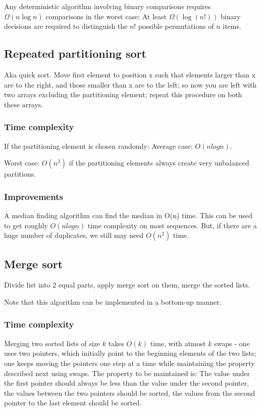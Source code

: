\documentclass[oneside, article]{memoir}
\begin{document}
Any deterministic algorithm involving binary comparisons requires \\$\Omega(n \log n)$ comparisons in the worst case: At least $\Omega(\log (n!))$ binary decisions are required to distinguish the $n!$ possible permutations of $n$ items.

\subsection{Repeated partitioning sort}
Aka quick sort. Move first element to position x such that elements larger than x are to the right, and those smaller than x are to the left; so now you are left with two arrays excluding the partitioning element; repeat this procedure on both these arrays.

\subsubsection{Time complexity}
If the partitioning element is chosen randomly: Average case: $O(n log n)$.

Worst case: $O(n^{2})$ if the partitioning elements always create very unbalanced partitions.

\subsubsection{Improvements}
A median finding algorithm can find the median in O(n) time. This can be used to get roughly $O(n log n)$ time complexity on most sequences. But, if there are a huge number of duplicates, we still may need $O(n^2)$ time.

\subsection{Merge sort}
Divide list into 2 equal parts, apply merge sort on them, merge the sorted lists.

Note that this algorithm can be implemented in a bottom-up manner.

\subsubsection{Time complexity}
Merging two sorted lists of size $k$ takes $O(k)$ time, with atmost $k$ swaps - one uses two pointers, which initially point to the beginning elements of the two lists; one keeps moving the pointers one step at a time while maintaining the property described next using swaps. The property to be maintained is: The value under the first pointer should always be less than the value under the second pointer, the values between the two pointers should be sorted, the values from the second pointer to the last element should be sorted.
\end{document}
